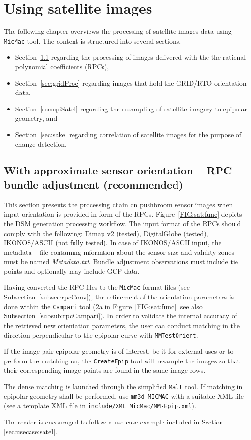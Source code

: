 \chapter{Using satellite images}\label{ch:useSat}
%
The following chapter overviews the processing of satellite images data using \texttt{MicMac} tool. The content is structured into several sections, 
\begin{itemize}
\item Section~\ref{sec:rpcBundle} regarding the processing of images delivered with the the rational polynomial coefficients (RPCs),
\item Section~\ref{sec:gridProc} regarding images that hold the GRID/RTO orientation data,
\item Section~\ref{sec:epiSatel} regarding the resampling of satellite imagery to epipolar geometry, and
\item Section~\ref{sec:sake} regarding correlation of satellite images for the purpose of change detection.
\end{itemize}
 
%
\section{With approximate sensor orientation -- RPC bundle adjustment (recommended)}\label{sec:rpcBundle}
This section presents the processing chain on pushbroom sensor images when input orientation is provided in form of the RPCs. Figure~\ref{FIG:sat:func} depicts the DSM generation processing workflow. The input format of the RPCs should comply with the following: Dimap v2 (tested), DigitalGlobe (tested), IKONOS/ASCII (not fully tested). In case of IKONOS/ASCII input, the metadata -- file containing informtion about the sensor size and validity zones -- must be named \textit{Metadata.txt}. Bundle adjustment observations must include tie points and optionally may include GCP data.\par  
%
Having converted the RPC files to the {\tt MicMac}-format files (see Subsection~\ref{subsec:rpcConv}), the refinement of the orientation parameters is done within the {\tt Campari} tool (2a in Figure~\ref{FIG:sat:func}; see also Subsection~\ref{subsub:rpcCampari}). In order to validate the internal accuracy of the retrieved new orientation parameters, the user can conduct matching in the direction perpendicular to the epipolar curve with {\tt MMTestOrient}.\par 
%
If the image pair epipolar geometry is of interest, be it for external uses or to perform the matching on, the {\tt CreateEpip} tool will resample the images so that their corresponding image points are found in the same image rows.\par 
%
The dense matching is launched through the simplified {\tt Malt} tool. If matching in epipolar geometry shall be performed, use {\tt mm3d MICMAC} with a suitable XML file (see a template XML file in {\tt include/XML\_MicMac/MM-Epip.xml}).\par 
%
The reader is encouraged to follow a use case example included in Section~ \ref{sec:usecase:satel}. 

